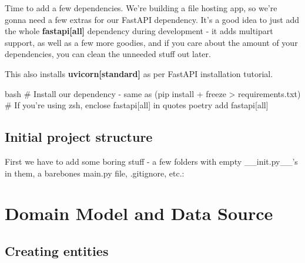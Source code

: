 \documentclass[14pt]{extarticle}
\begin{document}
Time to add a few dependencies. We're building a file hosting app, so we're gonna need a few extras for our FastAPI dependency. It's a good idea to just add the whole \textbf{fastapi[all]} dependency during development - it adds multipart support, as well as a few more goodies, and if you care about the amount of your dependencies, you can clean the unneeded stuff out later.

This also installs \textbf{uvicorn[standard]} as per FastAPI installation tutorial.

\begin{code}{bash}
    # Install our dependency - same as (pip install + freeze > requirements.txt)
    # If you're using zsh, enclose fastapi[all] in quotes
    poetry add fastapi[all]
\end{code}

\subsection{Initial project structure}

First we have to add some boring stuff - a few folders with empty \_\_init.py\_\_'s in them, a barebones main.py file, .gitignore, etc.:

\section{Domain Model and Data Source}

\subsection{Creating entities}
\end{document}
